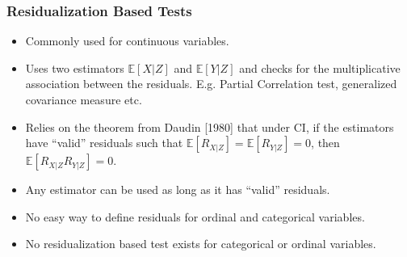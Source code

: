 \documentclass{beamer}
\def\ci{\perp\!\!\!\!\!\perp}
\begin{document}

% 

\begin{frame}
	\frametitle{Residualization Based Tests}
	\begin{itemize}
		\setlength\itemsep{1em}
		\item Commonly used for continuous variables.
		\item Uses two estimators $ \mathbb{E}[X| Z] $ and $
			\mathbb{E}[Y | Z] $ and checks for the multiplicative
			association between the residuals. E.g.
			Partial Correlation test, generalized covariance measure etc.
		\item Relies on the theorem from Daudin [1980] \footnotemark 
			that under CI, if the estimators have ``valid'' residuals
			such that $ \mathbb{E}[R_{X|Z}] = \mathbb{E}[R_{Y|Z}] = 0 $,
			then $ \mathbb{E}[R_{X|Z} R_{Y|Z}] = 0 $.
		\item Any estimator can be used as long as it has ``valid'' residuals.
		\item No easy way to define residuals for ordinal and categorical variables.
		\item No residualization based test exists for categorical or ordinal variables.
	\end{itemize}
\end{frame}
\end{document}
